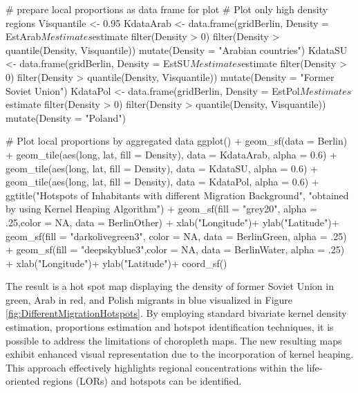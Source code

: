 \begin{example}
    # prepare local proportions as data frame for plot
    # Plot only high density regions
    Visquantile <- 0.95
    KdataArab <- 
        data.frame(gridBerlin, Density = EstArab$Mestimates$estimate %
            filter(Density > 0) %
            filter(Density > quantile(Density, Visquantile)) %
            mutate(Density = "Arabian countries")
    KdataSU <- 
        data.frame(gridBerlin, Density = EstSU$Mestimates$estimate %
            filter(Density > 0) %
            filter(Density > quantile(Density, Visquantile)) %
            mutate(Density = "Former Soviet Union")
    KdataPol <- 
        data.frame(gridBerlin, Density = EstPol$Mestimates$estimate %
            filter(Density > 0) %
            filter(Density > quantile(Density, Visquantile)) %
            mutate(Density = "Poland")
    
    # Plot local proportions by aggregated data
    ggplot() +
      geom_sf(data = Berlin) +
      geom_tile(aes(long, lat, fill = Density), data = KdataArab, alpha = 0.6) + 
      geom_tile(aes(long, lat, fill = Density), data = KdataSU, alpha = 0.6) + 
      geom_tile(aes(long, lat, fill = Density), data = KdataPol, alpha = 0.6) +
      ggtitle("Hotspots of Inhabitants with different Migration Background", 
              "obtained by using Kernel Heaping Algorithm") +
      geom_sf(fill = "grey20", alpha = .25,color = NA,
              data = BerlinOther) +
      xlab("Longitude")+ ylab("Latitude")+
      geom_sf(fill = "darkolivegreen3", color = NA,
              data = BerlinGreen, alpha = .25) +
      geom_sf(fill = "deepskyblue3",color = NA,
              data = BerlinWater, alpha = .25) +
      xlab("Longitude")+ ylab("Latitude")+
    coord_sf()
\end{example}
The result is a hot spot map displaying the density of former Soviet Union in green, Arab in red, and Polish migrants in blue visualized in Figure \ref{fig:DifferentMigrationHotspots}.
By employing standard bivariate kernel density estimation, proportions estimation and hotspot identification techniques, it is possible to address the limitations of choropleth maps. The new resulting maps exhibit enhanced visual representation due to the incorporation of kernel heaping. This approach effectively highlights regional concentrations within the life-oriented regions (LORs) and hotspots can be identified. 

